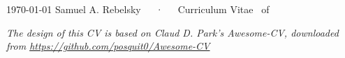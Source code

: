 \documentclass[11pt, letterpaper]{samr-cv}
\begin{document}

\begingroup
\renewcommand{\bibitem}[1]{}%
\endgroup

\vspace{-0.5in}
\makecvheader

\makecvfooter
  {\today}
  {Samuel A. Rebelsky~~~·~~~Curriculum Vitae}
  {\thepage\ of \pageref{LastPage}}







%
%
%
%
%
%
%

%
%


\vfill
\vhrulefill{0.1mm}
\begin{center}
{\fontsize{8pt}{1em}\bodyfont\itshape\color{lighttext} The design of this CV is based on Claud D. Park's Awesome-CV, downloaded from
\href{https://github.com/posquit0/Awesome-CV}{https://github.com/posquit0/Awesome-CV}}
\end{center}
\end{document}
